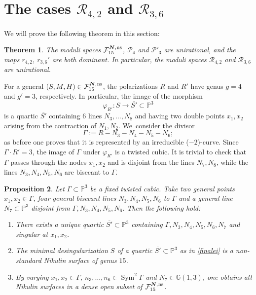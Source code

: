 \documentclass[11pt]{article}
\newcommand{\ns}{{\mkern1mu\mathrm{ns}}}
\newcommand{\bN}{\boldsymbol{N}}
\theoremstyle{plain}
\newtheorem{thm}{Theorem}[section]
\newtheorem{prop}[thm]{Proposition}
\theoremstyle{definition}
\DeclareMathOperator{\Sym}{Sym}
\newcommand\GG{{\mathbb G}}
\newcommand\PP{{\mathbb P}}
\newcommand\F{{\mathcal F}}
\renewcommand\P{{\mathcal P}}
\newcommand\R{{\mathcal R}}
\begin{document}
\section{The cases \texorpdfstring{$\R_{4,2}$ and $\R_{3,6}$}{R}}

We will prove the following theorem in this section:

\begin{thm}\label{brevetto}
The moduli spaces $\F_{15}^{\bN,\ns}$, $\P_4$ and $\P'_{3}$ are unirational, and the maps $r_{4,2}$, $r_{3,6}'$ are both dominant. In particular, the moduli spaces $\R_{4,2}$ and $\R_{3,6}$ are unirational.
\end{thm}
For a general $(S,M,H)\in \F_{15}^{\bN,\ns}$, the polarizations $R$ and $R'$ have genus $g=4$ and $g'=3$, respectively. In particular, the image of the morphism
\[
\varphi_{R'}:S\to \overline{S'}\subset \mathbb P^3
\]
is a quartic $\overline{S'}$ containing $6$ lines $N_3,\ldots,N_8$ and having two double points $x_1,x_2$ arising from the contraction of $N_1,N_2$. We~consider the divisor
\[
\Gamma:=R-N_3-N_4-N_5-N_6;
\]
as before one proves that it is represented by an irreducible ($-2$)-curve. Since $\Gamma\cdot R'=3$, the image of $\Gamma$ under $\varphi_{R'}$ is a twisted cubic. It is trivial to check that $\Gamma$ passes through the nodes $x_1,x_2$ and is disjoint from the lines $N_7,N_8$, while the lines $N_3,N_4,N_5,N_6$ are bisecant to $\Gamma$.

\begin{prop}\label{finale}
Let $\Gamma\subset \PP^3$ be a fixed twisted cubic. Take two general points $x_1,x_2\in \Gamma$, four general bisecant lines $N_3,N_4,N_5,N_6$ to $\Gamma$ and a general line $N_7\subset\PP^3$ disjoint from $\Gamma,N_3,N_4,N_5,N_6$. Then the following hold:
\begin{enumerate}
\item\label{finalei}
There exists a unique quartic $\overline{S'}\subset\mathbb P^3$ containing $\Gamma,N_3,N_4,N_5,N_6,N_7$ and singular at $x_1,x_2$.
\item\label{finaleii}
The minimal desingularization $S$ of a quartic $\overline{S'}\subset\mathbb P^3$ as in \eqref{finalei} is a non-standard Nikulin surface of genus $15$.
\item\label{finaleiii}
By varying $x_1,x_2\in \Gamma$, $n_3,\ldots, n_6\in \Sym^2\Gamma$ and $N_7\in \GG(1,3)$, one obtains all Nikulin surfaces in a dense open subset of $\F_{15}^{\bN,\ns}$.
\end{enumerate}
\end{prop}
\end{document}
